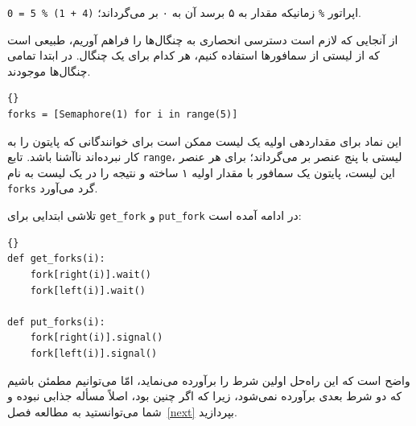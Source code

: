 \documentclass{book}
\begin{document}
    اپراتور {\tt \%} زمانیکه مقدار به ۵ برسد آن به ۰ بر می‌گرداند؛ {\tt (4 + 1) \% 5 = 0}.

    از آنجایی که لازم است دسترسی انحصاری به چنگال‌ها را فراهم آوریم، طبیعی است که از لیستی از سمافورها استفاده کنیم، هر کدام برای یک چنگال. 
    در ابتدا تمامی چنگال‌ها موجودند. 

\begin{latin}
\begin{lstlisting}[title=\rl{متغیرهای غذا خوردن فیلسوف‌ها}]{}
forks = [Semaphore(1) for i in range(5)]
\end{lstlisting}
\end{latin}

    این نماد برای مقداردهی اولیه یک لیست ممکن است برای خوانندگانی که  پایتون را به کار نبرده‌اند ناآشنا باشد. 
    تابع {\tt range}، لیستی با پنج عنصر بر‌ می‌گرداند؛ برای هر عنصر این لیست، پایتون یک سمافور با مقدار اولیه ۱ ساخته و نتیجه را در یک لیست 
    به نام  {\tt forks} گرد می‌آورد.  

    تلاشی ابتدایی برای  {\tt get\_fork} و {\tt put\_fork} در ادامه آمده است:

\begin{latin}
\begin{lstlisting}[title=\rl{ناراه‌حل غذا خوردن فیلسوف}]{}
def get_forks(i):
    fork[right(i)].wait()
    fork[left(i)].wait()

def put_forks(i):
    fork[right(i)].signal()
    fork[left(i)].signal()
\end{lstlisting}
\end{latin}

    واضح است که این راه‌حل اولین شرط را برآورده می‌نماید، امّا می‌توانیم مطمئن باشیم که دو شرط  بعدی برآورده نمی‌شود، زیرا که 
    اگر چنین بود، اصلاً مسأله جذابی نبوده و شما می‌توانستید به مطالعه فصل~\ref{next} بپردازید. 
\end{document}
